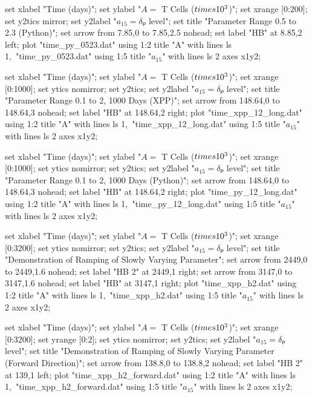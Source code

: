 \startGNUPLOTscript[time_py_0523]
  set xlabel "Time (days)";
  set ylabel "$A = $ T Cells ($\\times 10^3$)";
  set xrange [0:200];
  set y2tics mirror;
  set y2label "$a_{15} = δₚ$ level";
  set title "Parameter Range 0.5 to 2.3 (Python)";
  set arrow from 7.85,0 to 7.85,2.5 nohead;
  set label "HB" at 8.85,2 left;
  plot "time_py_0523.dat" using 1:2 title "A" with lines ls 1,\
       "time_py_0523.dat" using 1:5 title "$a_{15}$" with lines ls 2 axes x1y2;
\stopGNUPLOTscript

  set xlabel "Time (days)";
  set ylabel "$A = $ T Cells ($\\times 10^3$)";
  set xrange [0:1000];
  set ytics nomirror;
  set y2tics;
  set y2label "$a_{15} = δₚ$ level";
  set title "Parameter Range 0.1 to 2, 1000 Days (XPP)";
  set arrow from 148.64,0 to 148.64,3 nohead;
  set label "HB" at 148.64,2 right;
  plot "time_xpp_12_long.dat" using 1:2 title "A" with lines ls 1,\
       "time_xpp_12_long.dat" using 1:5 title "$a_{15}$" with lines ls 2 axes x1y2;
\stopGNUPLOTscript

  set xlabel "Time (days)";
  set ylabel "$A = $ T Cells ($\\times 10^3$)";
  set xrange [0:1000];
  set ytics nomirror;
  set y2tics;
  set y2label "$a_{15} = δₚ$ level";
  set title "Parameter Range 0.1 to 2, 1000 Days (Python)";
  set arrow from 148.64,0 to 148.64,3 nohead;
  set label "HB" at 148.64,2 right;
  plot "time_py_12_long.dat" using 1:2 title "A" with lines ls 1,\
       "time_py_12_long.dat" using 1:5 title "$a_{15}$" with lines ls 2 axes x1y2;
\stopGNUPLOTscript

  set xlabel "Time (days)";
  set ylabel "$A = $ T Cells ($\\times 10^3$)";
  set xrange [0:3200];
  set ytics nomirror;
  set y2tics;
  set y2label "$a_{15} = δₚ$ level";
  set title "Demonstration of Ramping of Slowly Varying Parameter";
  set arrow from 2449,0 to 2449,1.6 nohead;
  set label "HB 2" at 2449,1 right;
  set arrow from 3147,0 to 3147,1.6 nohead;
  set label "HB" at 3147,1 right;
  plot "time_xpp_h2.dat" using 1:2 title "A" with lines ls 1,\
       "time_xpp_h2.dat" using 1:5 title "$a_{15}$" with lines ls 2 axes x1y2;
\stopGNUPLOTscript

\startGNUPLOTscript[time_xpp_h2_forward]
  set xlabel "Time (days)";
  set ylabel "$A = $ T Cells ($\\times 10^3$)";
  set xrange [0:3200];
  set yrange [0:2];
  set ytics nomirror;
  set y2tics;
  set y2label "$a_{15} = δₚ$ level";
  set title "Demonstration of Ramping of Slowly Varying Parameter (Forward Direction)";
  set arrow from 138.8,0 to 138.8,2 nohead;
  set label "HB 2" at 139,1 left;
  plot "time_xpp_h2_forward.dat" using 1:2 title "A" with lines ls 1,\
       "time_xpp_h2_forward.dat" using 1:5 title "$a_{15}$" with lines ls 2 axes x1y2;
\stopGNUPLOTscript

